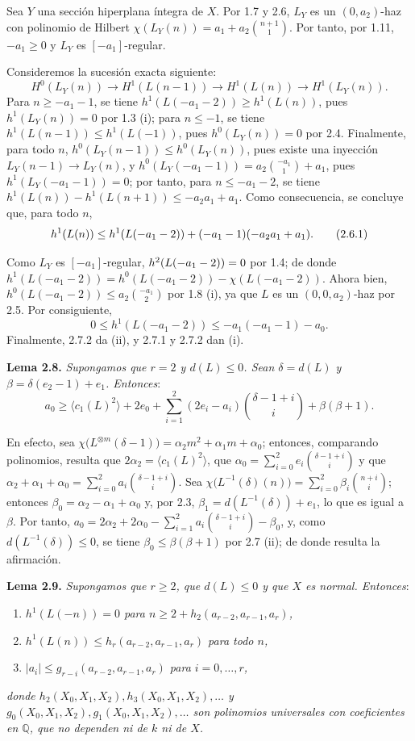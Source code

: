 Sea \(Y\) una sección hiperplana íntegra de \(X\). Por 1.7 y 2.6, \(L_Y\)
es un \((0,a_2)\)-haz con polinomio de Hilbert
\(\chi(L_Y(n))=a_1+a_2\binom{n+1}{1}\). Por tanto, por 1.11,
\(-a_1\ge0\) y \(L_Y\) es \([-a_1]\)-regular.

Consideremos la sucesión exacta siguiente:
\[
H^0(L_Y(n))\longrightarrow H^1(L(n-1))
\longrightarrow H^1(L(n))\longrightarrow H^1(L_Y(n)).
\]
Para \(n\ge -a_1-1\), se tiene
\(h^1(L(-a_1-2))\ge h^1(L(n))\), pues \(h^1(L_Y(n))=0\) por 1.3 (i); para
\(n\le -1\), se tiene \(h^1(L(n-1))\le h^1(L(-1))\), pues
\(h^0(L_Y(n))=0\) por 2.4. Finalmente, para todo \(n\),
\(h^0(L_Y(n-1))\le h^0(L_Y(n))\), pues existe una inyección
\(L_Y(n-1)\longrightarrow L_Y(n)\), y
\(h^0(L_Y(-a_1-1))=a_2\binom{-a_1}{1}+a_1\), pues
\(h^1(L_Y(-a_1-1))=0\); por tanto, para \(n\le -a_1-2\), se tiene
\(h^1(L(n))-h^1(L(n+1))\le -a_2a_1+a_1\). Como consecuencia, se concluye
que, para todo \(n\),
\[
h^1(L(n))\le h^1(L(-a_1-2))+(-a_1-1)(-a_2a_1+a_1).
\tag{\sisi{2.7.1}{2.6.1}}
\]

Como \(L_Y\) es \([-a_1]\)-regular, \(h^2(L(-a_1-2))=0\) por 1.4; de donde %
\(h^1(L(-a_1-2))=h^0(L(-a_1-2))-\chi(L(-a_1-2))\). Ahora bien,
\(h^0(L(-a_1-2))\le a_2\binom{-a_1}{2}\) por 1.8 (i), ya que \(L\) es un
\((0,0,a_2)\)-haz por 2.5. Por consiguiente,
\[
0\le h^1(L(-a_1-2))\le -a_1(-a_1-1)-a_0.
\tag{2.7.2}
\]
Finalmente, 2.7.2 da (ii), y 2.7.1 y 2.7.2 dan (i).

\textbf{Lema 2.8.} \emph{Supongamos que \(r=2\) y \(d(L)\le0\). Sean
\(\delta=d(L)\) y \(\beta=\delta(e_2-1)+e_1\). Entonces}:
\[
a_0\ge
\langle c_1(L)^2\rangle+2e_0+
\sum_{i=1}^{2}(2e_i-a_i)\binom{\delta-1+i}{i}
+\beta(\beta+1).
\]

En efecto, sea
\(\chi\bigl(L^{\otimes m}(\delta-1)\bigr)=\alpha_2m^2+\alpha_1m+\alpha_0\);
entonces, comparando polinomios, resulta que
\(2\alpha_2=\langle c_1(L)^2\rangle\), que
\(\alpha_0=\sum_{i=0}^{2}e_i\binom{\delta-1+i}{i}\) y que
\(\alpha_2+\alpha_1+\alpha_0=\sum_{i=0}^{2}a_i\binom{\delta-1+i}{i}\).
Sea
\(\chi\bigl(L^{-1}(\delta)(n)\bigr)=\sum_{i=0}^{2}\beta_i\binom{n+i}{i}\);
entonces \(\beta_0=\alpha_2-\alpha_1+\alpha_0\) y, por 2.3,
\(\beta_1=d(L^{-1}(\delta))+e_1\), lo que es igual a \(\beta\). Por tanto,
\(a_0=2\alpha_2+2\alpha_0-\sum_{i=1}^{2}a_i\binom{\delta-1+i}{i}-\beta_0\),
y, como \(d(L^{-1}(\delta))\le0\), se tiene
\(\beta_0\le\beta(\beta+1)\) por 2.7 (ii); de donde resulta la afirmación.

\textbf{Lema 2.9.} \emph{Supongamos que \(r\ge2\), que \(d(L)\le0\) y que
\(X\) es normal. Entonces}:
\begin{enumerate}[label=(\roman*)]
\item \emph{\(h^1(L(-n))=0\) para
\(n\ge2+h_2(a_{r-2},a_{r-1},a_r)\),}
\item \emph{\(h^1(L(n))\le h_r(a_{r-2},a_{r-1},a_r)\) para todo \(n\),}
\item \emph{\(|a_i|\le g_{r-i}(a_{r-2},a_{r-1},a_r)\) para
\(i=0,\ldots,r\),}
\end{enumerate}
\emph{donde
\(h_2(X_0,X_1,X_2),h_3(X_0,X_1,X_2),\ldots\) y
\(g_0(X_0,X_1,X_2),g_1(X_0,X_1,X_2),\ldots\) son polinomios universales con
coeficientes en \(\mathbb Q\), que no dependen ni de \(k\) ni de \(X\).}

